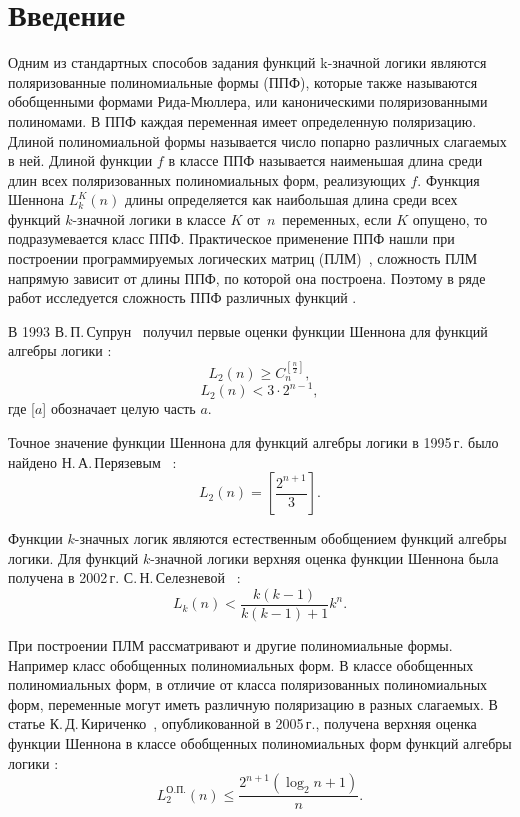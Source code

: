 \documentclass[bibliography=totoc, a4paper, 14pt]{extarticle}
\let\stdsection\section
\renewcommand\section{\newpage\stdsection}
\begin{document}
\setcounter{page}{2}
\setcounter{secnumdepth}{-1}

\tableofcontents

\section{Введение}
Одним из стандартных способов задания функций k\nobreakdash-значной логики являются поляризованные
полиномиальные формы (ППФ), которые также называются обобщенными формами Рида-Мюллера, или
каноническими поляризованными полиномами. В ППФ каждая переменная имеет определенную поляризацию.
Длиной полиномиальной формы называется число попарно различных слагаемых в ней. Длиной функции $f$
в классе ППФ называется наименьшая длина среди длин всех поляризованных полиномиальных форм,
реализующих $f$. Функция Шеннона $L^K_k(n)$ длины определяется как наибольшая длина среди всех
функций $k$\nobreakdash-значной логики в классе $K$ от~$n$~переменных, если $K$ опущено, то
подразумевается класс ППФ. Практическое применение ППФ нашли при построении программируемых
логических матриц (ПЛМ)~\cite{ue04, sb90}, сложность ПЛМ напрямую зависит от длины ППФ, по которой
она построена. Поэтому в ряде работ исследуется сложность ППФ различных функций
\cite{sv93,pn95,ss02,kk05,sd08,mn12,sm09}.

В 1993  В.\,П.\,Супрун~\cite{sv93} получил первые оценки функции Шеннона для функций алгебры логики :
$$
L_2(n) \geqslant C_n^{[\frac{n}{2}]},
$$
$$
L_2(n) < 3 \cdot 2^{n-1},
$$
где [$a$] обозначает целую часть $a$.

Точное значение функции Шеннона для функций алгебры логики в 1995\,г. было
найдено Н.\,А.\,Перязевым~\cite{pn95} :
$$
L_2(n) = \left[\frac{2^{n+1}}{3}\right].
$$

Функции $k$\nobreakdash-значных логик являются естественным обобщением функций алгебры логики.
Для функций $k$\nobreakdash-значной логики верхняя оценка функции Шеннона была получена в 2002\,г. С.\,Н.\,Селезневой~\cite{ss02} :
$$
L_k(n) < \frac{k(k-1)}{k(k-1)+1}k^n.
$$

При построении ПЛМ рассматривают и другие полиномиальные формы. Например класс обобщенных полиномиальных форм.
В классе обобщенных полиномиальных форм, в отличие от класса поляризованных полиномиальных форм, переменные могут иметь
различную поляризацию в разных слагаемых. В статье К.\,Д.\,Кириченко~\cite{kk05}, опубликованной в 2005\,г., получена верхняя оценка
функции Шеннона в классе обобщенных полиномиальных форм функций алгебры логики :
$$
L^{\text{О.П.}}_2(n) \leqslant \frac{2 ^ {n + 1}(\log_2n+1)}{n}.
$$
\end{document}
